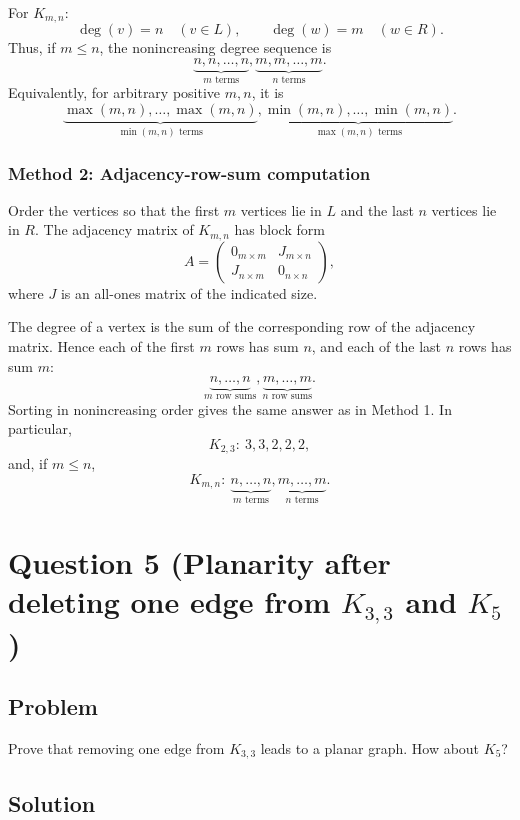\documentclass[12pt]{article}
\begin{document}
For $K_{m,n}$:
\[
\deg(v)=n\quad (v\in L),
\qquad
\deg(w)=m\quad (w\in R).
\]
Thus, if $m\le n$, the nonincreasing degree sequence is
\[
\boxed{\underbrace{n,n,\dots,n}_{m\text{ terms}},\underbrace{m,m,\dots,m}_{n\text{ terms}}.}
\]
Equivalently, for arbitrary positive $m,n$, it is
\[
\boxed{
\underbrace{\max(m,n),\dots,\max(m,n)}_{\min(m,n)\text{ terms}},
\underbrace{\min(m,n),\dots,\min(m,n)}_{\max(m,n)\text{ terms}}.}
\]

\subsubsection{Method 2: Adjacency-row-sum computation}
Order the vertices so that the first $m$ vertices lie in $L$ and the last $n$ vertices lie in $R$. The adjacency matrix of $K_{m,n}$ has block form
\[
A=
\begin{pmatrix}
0_{m\times m} & J_{m\times n}\\
J_{n\times m} & 0_{n\times n}
\end{pmatrix},
\]
where $J$ is an all-ones matrix of the indicated size.

The degree of a vertex is the sum of the corresponding row of the adjacency matrix. Hence each of the first $m$ rows has sum $n$, and each of the last $n$ rows has sum $m$:
\[
\underbrace{n,\dots,n}_{m\text{ row sums}},
\underbrace{m,\dots,m}_{n\text{ row sums}}.
\]
Sorting in nonincreasing order gives the same answer as in Method 1. In particular,
\[
\boxed{K_{2,3}:\ 3,3,2,2,2,}
\]
and, if $m\le n$,
\[
\boxed{K_{m,n}:\ \underbrace{n,\dots,n}_{m\text{ terms}},\underbrace{m,\dots,m}_{n\text{ terms}}.}
\]

\newpage
\section{Question 5 (Planarity after deleting one edge from $K_{3,3}$ and $K_5$)}

\subsection{Problem}
Prove that removing one edge from $K_{3,3}$ leads to a planar graph. How about $K_5$?

\subsection{Solution}
\end{document}
